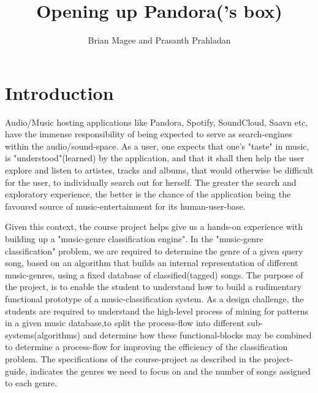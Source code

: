 \documentclass[12pt]{article}
\begin{document}
                                       
\title{Opening up Pandora('s box)}
\author{Brian Magee and Prasanth Prahladan}
\maketitle

\section{Introduction}

Audio/Music hosting applications like Pandora, Spotify, SoundCloud, Saavn etc, have the immense responsibility of being expected to serve as search-engines within the audio/sound-space. As a user, one expects that one's "taste" in music, is "understood"(learned) by the application, and that it shall then help the user explore and listen to artistes, tracks and albums, that would otherwise be difficult for the user, to individually search out for herself. The greater the search and exploratory experience, the better is the chance of the application being the favoured source of music-entertainment for its human-user-base.

Given this context, the course project helps give us a hands-on experience with building up a "music-genre classification engine". In the "music-genre classification" problem, we are required to determine the genre of a given query song, based on an algorithm that builds an internal representation of different music-genres, using a fixed database of classified(tagged) songs. The purpose of the project, is to enable the student to understand how to build a rudimentary functional prototype of a music-classification system. As a design challenge, the students are required to understand the high-level process of mining for patterns in a given music database,to split the process-flow into different sub-systems(algorithms) and determine how these functional-blocks may be combined to determine a process-flow for improving the efficiency of the classification problem. The specifications of the course-project as described in the project-guide, indicates the genres we need to focus on and the number of songs assigned to each genre. 
\end{document}
